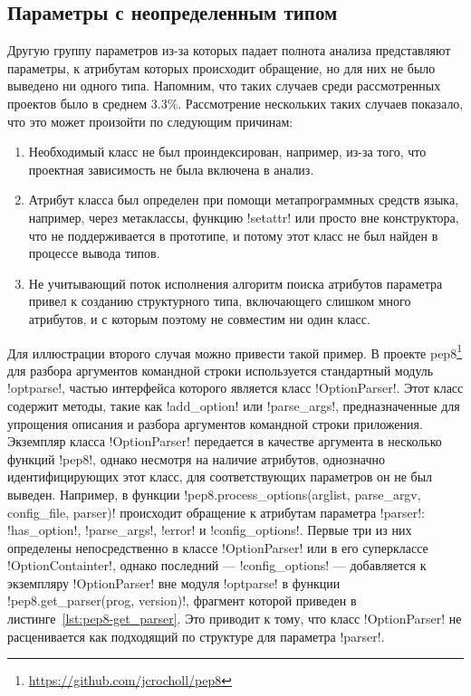 \subsection{Параметры с неопределенным типом}
\label{sub:undefined-type-parameters}

Другую группу параметров из-за которых падает полнота анализа представляют
параметры, к атрибутам которых происходит обращение, но для них не было выведено
ни одного типа. Напомним, что таких случаев среди рассмотренных проектов было в
среднем 3.3\%. Рассмотрение нескольких таких случаев показало, что это может произойти
по следующим причинам:

\begin{enumerate}
    \item Необходимый класс не был проиндексирован, например, из-за того, что
      проектная зависимость не была включена в анализ.

    \item Атрибут класса был определен при помощи метапрограммных средств языка,
      например, через метаклассы, функцию !setattr! или просто
      вне конструктора, что не поддерживается в прототипе, и потому этот класс не был
      найден в процессе вывода типов.

    \item Не учитывающий поток исполнения алгоритм поиска атрибутов параметра
      привел к созданию структурного типа, включающего слишком много
      атрибутов, и с которым поэтому не совместим ни один класс.

\end{enumerate}

Для иллюстрации второго случая можно привести такой пример. В проекте
pep8\footnote{\url{https://github.com/jcrocholl/pep8}} для разбора аргументов
командной строки используется стандартный модуль !optparse!, частью интерфейса
которого является класс !OptionParser!. Этот класс содержит методы, такие как
!add_option! или !parse_args!, 
предназначенные для упрощения описания и разбора аргументов командной строки
приложения. Экземпляр класса !OptionParser! передается в качестве аргумента в
несколько функций !pep8!, однако несмотря на наличие атрибутов, однозначно
идентифицирующих этот класс, для соответствующих параметров он не был выведен.
Например, в функции !pep8.process_options(arglist, parse_argv, config_file, parser)!
происходит обращение к атрибутам параметра
!parser!: !has_option!, !parse_args!, !error! и !config_options!. Первые три из
них определены непосредственно в классе !OptionParser! или в его суперклассе
!OptionContainter!, однако последний --- !config_options! --- добавляется к
экземпляру !OptionParser! вне модуля !optparse! в функции
!pep8.get_parser(prog, version)!, фрагмент которой приведен в
листинге~\ref{lst:pep8-get_parser}. Это приводит к тому, что класс
!OptionParser! не расценивается как подходящий по структуре для параметра
!parser!.

